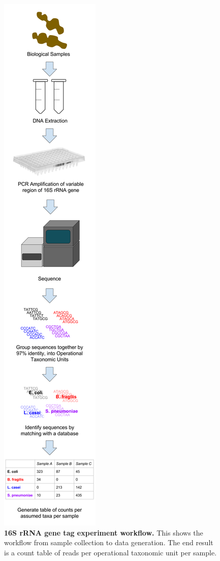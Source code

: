 \begin{figure}[h]
\begin{center}
\includegraphics[height=0.8\textheight]{16S_rRNA_pipeline.png}
\caption{\textbf{16S rRNA gene tag experiment workflow.} This shows the workflow from sample collection to data generation. The end result is a count table of reads per operational taxonomic unit per sample.}
\end{center}
\end{figure}

